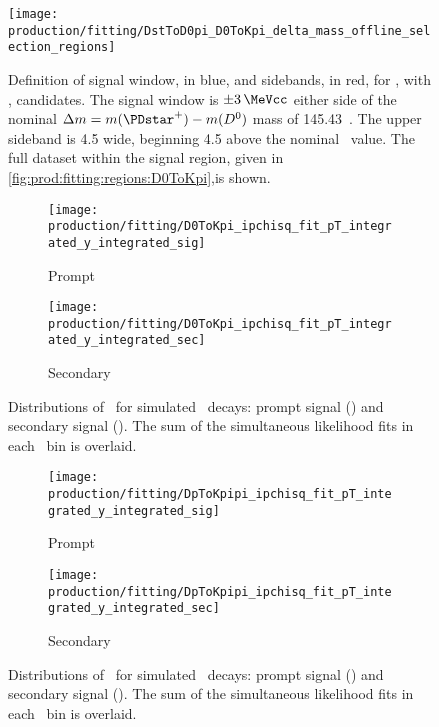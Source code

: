 \begin{figure}
  \centering
  \texttt{[image: production/fitting/DstToD0pi\_D0ToKpi\_delta\_mass\_offline\_selection\_regions]}
  \caption{%
    Definition of signal window, in blue, and sidebands, in red, for 
    \DstToDzpi, with \DzToKpi, candidates.
    The signal window is $\pm\SI{3}{\MeVcc}$ either side of the nominal 
    $\deltam = m(\PDstarp) - m(\PDzero)$ mass of 
    \SI{145.43}{\MeVcc}~\cite{PDG2014}.
    The upper sideband is \SI{4.5}{\MeVcc} wide, beginning \SI{4.5}{\MeVcc} 
    above the nominal \deltam\ value.
    The full dataset within the \PDzero signal region, given in 
    \cref{fig:prod:fitting:regions:D0ToKpi},is shown.
  }
  \label{fig:prod:fitting:regions:DstToD0pi_D0ToKpi}
\end{figure}

\begin{figure}
  \begin{subfigure}[b]{0.5\textwidth}
    \centering
    \texttt{[image: production/fitting/D0ToKpi\_ipchisq\_fit\_pT\_integrated\_y\_integrated\_sig]}
    \caption{Prompt}
    \label{fig:prod:fitting:prefits:D0ToKpi:prompt}
  \end{subfigure}
  \begin{subfigure}[b]{0.5\textwidth}
    \centering
    \texttt{[image: production/fitting/D0ToKpi\_ipchisq\_fit\_pT\_integrated\_y\_integrated\_sec]}
    \caption{Secondary}
    \label{fig:prod:fitting:prefits:D0ToKpi:secondary}
  \end{subfigure}
  \caption{%
    Distributions of \lnipchisq\ for simulated \DzToKpi\ decays: prompt signal 
    \PDzero () and secondary 
    signal \PDzero ().
    The sum of the simultaneous likelihood fits in each \pTy\ bin is overlaid.
  }
  \label{fig:prod:fitting:prefits:D0ToKpi}
\end{figure}

\begin{figure}
  \begin{subfigure}[b]{0.5\textwidth}
    \centering
    \texttt{[image: production/fitting/DpToKpipi\_ipchisq\_fit\_pT\_integrated\_y\_integrated\_sig]}
    \caption{Prompt}
    \label{fig:prod:fitting:prefits:DpToKpipi:prompt}
  \end{subfigure}
  \begin{subfigure}[b]{0.5\textwidth}
    \centering
    \texttt{[image: production/fitting/DpToKpipi\_ipchisq\_fit\_pT\_integrated\_y\_integrated\_sec]}
    \caption{Secondary}
    \label{fig:prod:fitting:prefits:DpToKpipi:secondary}
  \end{subfigure}
  \caption{%
    Distributions of \lnipchisq\ for simulated \DpToKpipi\ decays: prompt 
    signal \PDplus () and 
    secondary signal \PDplus 
    ().
    The sum of the simultaneous likelihood fits in each \pTy\ bin is overlaid.
  }
  \label{fig:prod:fitting:prefits:DpToKpipi}
\end{figure}

